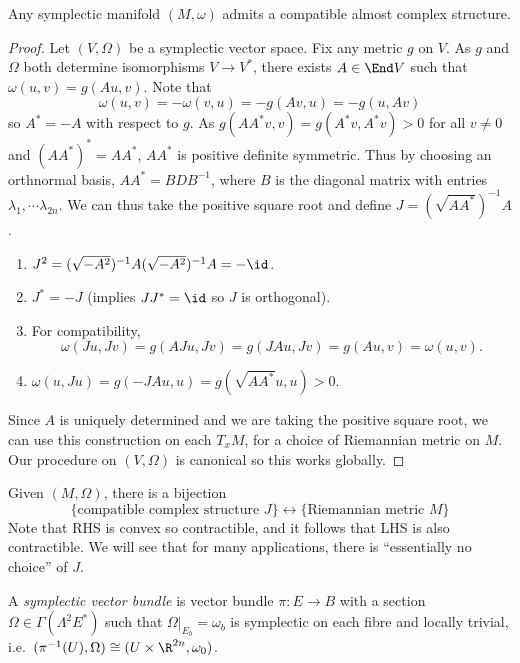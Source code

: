 \documentclass[a4paper]{article}
\begin{document}
\begin{proposition}
  Any symplectic manifold \((M, \omega)\) admits a compatible almost complex structure.
\end{proposition}

\begin{proof}
  Let \((V, \Omega)\) be a symplectic vector space. Fix any metric \(g\) on \(V\). As \(g\) and \(\Omega\) both determine isomorphisms \(V \to V^*\), there exists \(A \in \End V\) such that \(\omega(u, v) = g(Au, v)\). Note that
  \[
    \omega(u, v) = -\omega(v, u) = -g(Av, u) = -g(u, Av)
  \]
  so \(A^* = -A\) with respect to \(g\). As \(g(AA^*v, v) = g(A^*v, A^*v) > 0\) for all \(v \ne 0\) and \((AA^*)^* = AA^*\), \(AA^*\) is positive definite symmetric. Thus by choosing an orthnormal basis, \(AA^* = BDB^{-1}\), where \(B\) is the diagonal matrix with entries \(\lambda_1, \cdots \lambda_{2n}\). We can thus take the positive square root and define \(J = (\sqrt{AA^*})^{-1}A\).
  \begin{enumerate}
  \item \(J^2 = (\sqrt{-A^2})^{-1}A(\sqrt{-A^2})^{-1}A = -\id\).
  \item \(J^* = -J\) (implies \(JJ^* = \id\) so \(J\) is orthogonal).
  \item For compatibility,
    \[
      \omega(Ju, Jv) = g(AJu, Jv) = g(JAu, Jv) = g(Au, v) = \omega(u, v).
    \]
  \item \(\omega(u, Ju) = g(-JAu, u) = g(\sqrt{AA^*} u, u) > 0\).
  \end{enumerate}

  Since \(A\) is uniquely determined and we are taking the positive square root, we can use this construction on each \(T_xM\), for a choice of Riemannian metric on \(M\). Our procedure on \((V, \Omega)\) is canonical so this works globally.
\end{proof}

\begin{note}
  Given \((M, \Omega)\), there is a bijection
  \[
    \{\text{compatible complex structure } J\} \longleftrightarrow \{\text{Riemannian metric } M\}
  \]
  Note that RHS is convex so contractible, and it follows that LHS is also contractible. We will see that for many applications, there is ``essentially no choice'' of \(J\).
\end{note}

\begin{definition}
  A \emph{symplectic vector bundle} is vector bundle \(\pi: E \to B\) with a section \(\Omega \in \Gamma(\Lambda^2E^*)\) such that \(\Omega|_{E_b} = \omega_b\) is symplectic on each fibre and locally trivial, i.e.\ \((\pi^{-1}(U), \Omega) \cong (U \times \R^{2n}, \omega_0)\).
\end{definition}
\end{document}
